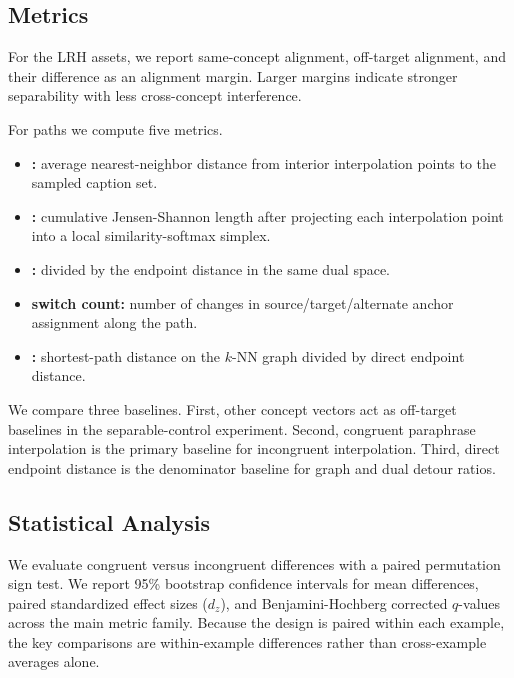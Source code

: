 \subsection{Metrics}

 For the LRH assets, we report same-concept alignment, off-target alignment, and their difference as an alignment margin. Larger margins indicate stronger separability with less cross-concept interference.

 For \sugarcrepe paths we compute five metrics.
\begin{itemize}[leftmargin=*,itemsep=1pt,topsep=2pt]
    \item {\bf \offmanifold:} average nearest-neighbor distance from interior interpolation points to the sampled caption set.
    \item {\bf \dualpath:} cumulative Jensen-Shannon length after projecting each interpolation point into a local similarity-softmax simplex.
    \item {\bf \dualratio:} \dualpath divided by the endpoint distance in the same dual space.
    \item {\bf switch count:} number of changes in source/target/alternate anchor assignment along the path.
    \item {\bf \graphratio:} shortest-path distance on the $k$-NN graph divided by direct endpoint distance.
\end{itemize}

 We compare three baselines. First, other concept vectors act as off-target baselines in the separable-control experiment. Second, congruent paraphrase interpolation is the primary baseline for incongruent interpolation. Third, direct endpoint distance is the denominator baseline for graph and dual detour ratios.

\subsection{Statistical Analysis}

 We evaluate congruent versus incongruent differences with a paired permutation sign test. We report 95\% bootstrap confidence intervals for mean differences, paired standardized effect sizes ($d_z$), and Benjamini-Hochberg corrected $q$-values across the main metric family. Because the design is paired within each example, the key comparisons are within-example differences rather than cross-example averages alone.
